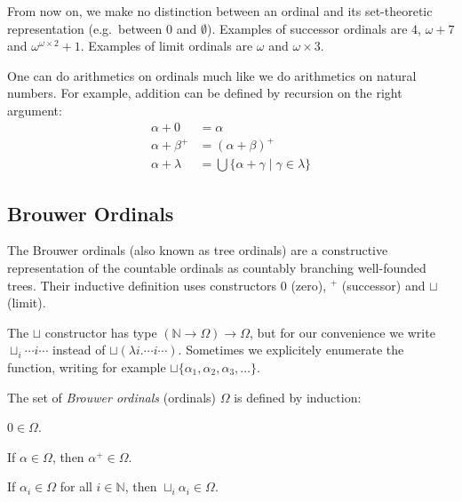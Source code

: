 From now on, we make no distinction between an ordinal and its set-theoretic
representation (e.g.\ between $0$ and $\emptyset$). Examples of successor
ordinals are $4$, $\omega + 7$  and $\omega^{\omega \times 2} + 1$. Examples
of limit ordinals are $\omega$ and $\omega \times 3$.


One can do arithmetics on ordinals much like we do arithmetics on natural
numbers. For example, addition can be defined by recursion on the right
argument:
\begin{align*}
  \alpha + 0       &= \alpha\\
  \alpha + \beta^+ &= (\alpha + \beta)^+\\
  \alpha + \lambda &= \bigcup \{ \alpha + \gamma \; | \; \gamma \in \lambda \}
\end{align*}


\subsection{Brouwer Ordinals}\label{sub:brouwer}

The Brouwer ordinals (also known as tree ordinals) are a constructive
representation of the countable ordinals as countably branching well-founded
trees. Their inductive definition uses constructors $0$ (zero), $^+$
(successor) and $\sqcup$ (limit).

The $\sqcup$ constructor has type $(\mathbb{N} \rightarrow \Omega) \rightarrow
\Omega$, but for our convenience we write $\sqcup_i \cdots i \cdots$ instead
of $\sqcup (\lambda i . \cdots i \cdots)$. Sometimes we explicitely enumerate
the function, writing for example $\sqcup \{ \alpha_1, \alpha_2, \alpha_3,
\ldots \}$.

\begin{definition}\label{def:ordinals}%
The set of \emph{Brouwer ordinals} (ordinals) $\Omega$ is defined by
induction:
\begin{compactenum}
  \item
    $0 \in \Omega$.
  \item
    If $\alpha \in \Omega$, then $\alpha^+ \in \Omega$.
  \item
    If $\alpha_i \in \Omega$ for all $i \in \mathbb{N}$, then $\sqcup_i
    \alpha_i \in \Omega$.
\end{compactenum}
\end{definition}

